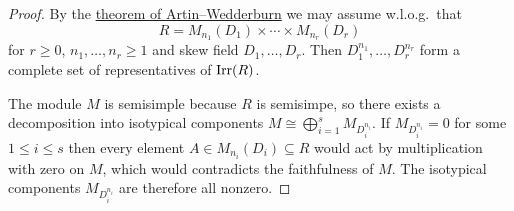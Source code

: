 \begin{proof}
  By the \hyperref[theorem: artin wedderburn theorem]{theorem of Artin--Wedderburn} we may assume w.l.o.g.\ that
  \[
    R = M_{n_1}(D_1) \times \dotsb \times M_{n_r}(D_r)
  \]
  for $r \geq 0$, $n_1, \dotsc, n_r \geq 1$ and skew field $D_1, \dotsc, D_r$.
  Then $D_1^{n_1}, \dotsc, D_r^{n_r}$ form a complete set of representatives of $\operatorname{Irr}(R)$.
  
  The module $M$ is semisimple because $R$ is semisimpe, so there exists a decomposition into isotypical components $M \cong \bigoplus_{i=1}^s M_{D_i^{n_i}}$.
  If $M_{D_i^{n_i}} = 0$ for some $1 \leq i \leq s$ then every element $A \in M_{n_i}(D_i) \subseteq R$ would act by multiplication with zero on $M$, which would contradicts the faithfulness of $M$.
  The isotypical components $M_{D_i^{n_i}}$ are therefore all nonzero.
\end{proof}




